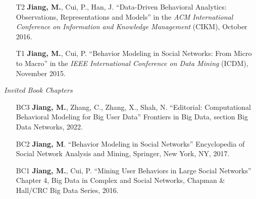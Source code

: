 \documentclass[10pt]{article}
\newenvironment{myindentpar}[1]%
{\begin{list}{}%
         {\setlength{\leftmargin}{#1}}%
         \item[]%
}
{\end{list}}
\newcounter{list}
\newcommand{\hide}[1]{}
\begin{document}
\begin{myindentpar}{0.00cm}
\begin{enumerate}[leftmargin=.5cm]
\item[T2] \textbf{Jiang, M.}, Cui, P., Han, J. ``Data-Driven Behavioral Analytics: Observations, Representations and Models'' in the \textit{ACM International Conference on Information and Knowledge Management} (CIKM), October 2016.
		
\item[T1] \textbf{Jiang, M.}, Cui, P. ``Behavior Modeling in Social Networks: From Micro to Macro'' in the \textit{IEEE International Conference on Data Mining} (ICDM), November 2015.

\end{enumerate}

\hspace{-0.25cm}\textit{Invited Book Chapters}

\begin{enumerate}[leftmargin=.5cm]

\item[BC3] \textbf{Jiang, M.}, Zhang, C., Zhang, X., Shah, N. ``Editorial: Computational Behavioral Modeling for Big User Data'' Frontiers in Big Data, section Big Data Networks, 2022.
		
\item[BC2] \textbf{Jiang, M}. ``Behavior Modeling in Social Networks'' Encyclopedia of Social Network Analysis and Mining, Springer, New York, NY, 2017.
		
\item[BC1] \textbf{Jiang, M.}, Cui, P. ``Mining User Behaviors in Large Social Networks'' Chapter 4, Big Data in Complex and Social Networks, Chapman \& Hall/CRC Big Data Series, 2016.

\end{enumerate}

\hide{
\hspace{-0.25cm}\textit{Preprints}

\begin{enumerate}[leftmargin=.5cm]

\item[P33] @Liu, G., @Zhao, T., Xu, J., Luo, T., \textbf{Jiang, M.} ``Graph Rationalization with Environment-based Augmentations'', in \textit{arXiv preprint arXiv:2206.02886}, June 2022. (accepted in KDD 2022)

\item[P32] @Yu, W., Zhu, C., Qin, L., @Zhao, T. \textbf{Jiang, M.} ``Diversifying Content Generation for Commonsense Reasoning with Mixture of Knowledge Graph Experts'', in \textit{arXiv preprint arXiv:2203.07285}, March 2022. (accepted in ACL 2022)


\end{enumerate}}
\end{myindentpar}
\end{document}
